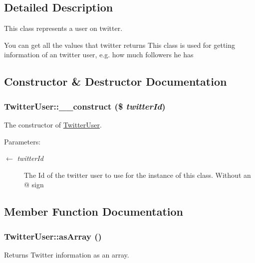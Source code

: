\subsection{Detailed Description}
This class represents a user on twitter. 

You can get all the values that twitter returns This class is used for getting information of an twitter user, e.g. how much followers he has 

\subsection{Constructor \& Destructor Documentation}
\hypertarget{class_twitter_user_ac09b350e318425625ba5766fdd28118}{
\subsubsection[{\_\-\_\-construct}]{\setlength{\rightskip}{0pt plus 5cm}TwitterUser::\_\-\_\-construct (\$ {\em twitterId})}}
\label{class_twitter_user_ac09b350e318425625ba5766fdd28118}


The constructor of \hyperlink{class_twitter_user}{TwitterUser}. 

\begin{Desc}
\item[Parameters:]
\begin{description}
\item[\mbox{$\leftarrow$} {\em twitterId}]The Id of the twitter user to use for the instance of this class. Without an @ sign \end{description}
\end{Desc}


\subsection{Member Function Documentation}
\hypertarget{class_twitter_user_0badd8e7ffdf4e7c30f4954d782efc21}{
\subsubsection[{asArray}]{\setlength{\rightskip}{0pt plus 5cm}TwitterUser::asArray ()}}
\label{class_twitter_user_0badd8e7ffdf4e7c30f4954d782efc21}


Returns Twitter information as an array. 

